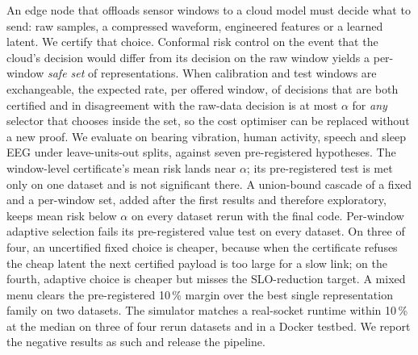 An edge node that offloads sensor windows to a cloud model must decide what to send: raw samples,
a compressed waveform, engineered features or a learned latent. We certify that choice. Conformal
risk control on the event that the cloud's decision would differ from its decision on the raw
window yields a per-window \emph{safe set} of representations. When calibration and test windows
are exchangeable, the expected rate, per offered window, of decisions that are both certified and
in disagreement with the raw-data decision is at most $\alpha$ for \emph{any} selector that chooses
inside the set, so the cost optimiser can be replaced without a new proof. We evaluate on
bearing vibration, human activity, speech and sleep EEG under leave-units-out splits, against
seven pre-registered hypotheses. The window-level certificate's mean risk lands near $\alpha$; its
pre-registered test is met only on one dataset and is not significant there. A union-bound cascade
of a fixed and a per-window set, added after the first results and therefore exploratory, keeps
mean risk below $\alpha$ on every dataset rerun with the final code. Per-window adaptive selection
fails its pre-registered value test on every dataset. On three of four, an uncertified fixed
choice is cheaper, because when the certificate refuses the cheap latent the next certified payload
is too large for a slow link; on the fourth, adaptive choice is cheaper but misses the SLO-reduction
target. A mixed menu clears the pre-registered 10\,\% margin over the best single representation
family on two datasets. The simulator
matches a real-socket runtime within 10\,\% at the median on three of four rerun datasets and in a
Docker testbed. We report the negative results as such and release the pipeline.
